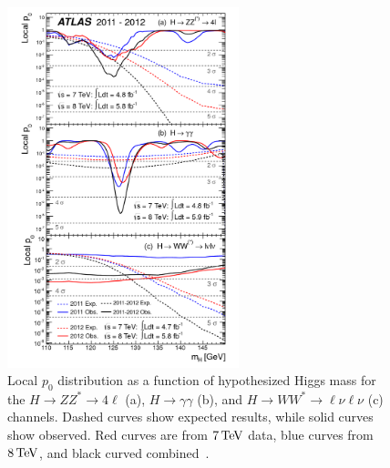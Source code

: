 \begin{figure}[h!]
  \centering
  \captionsetup{justification=centering}
  \includegraphics[width=0.6\textwidth]{figures/discovery_p0_comp}
  \caption{Local $p_0$ distribution as a function of hypothesized Higgs mass for the $H\to ZZ^* \to 4\ell$ (a), $H\to\gamma\gamma$ (b), and $H\to WW^*\to \ell\nu\ell\nu$ (c) channels. Dashed curves show expected results, while solid curves show observed. Red curves are from $7 \TeV$ data, blue curves from $8\TeV$, and black curved combined~\cite{Discovery}.}
  \label{fig:disc_p0_comp}
\end{figure}


